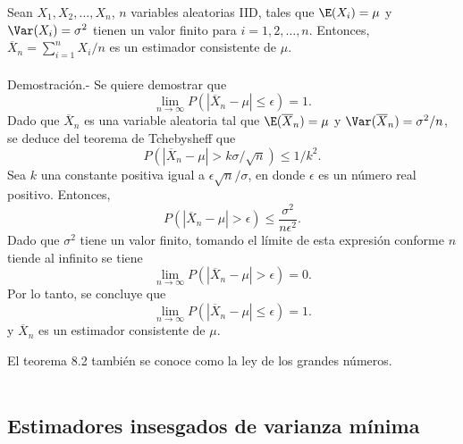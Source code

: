 \begin{teo}
    Sean $X_1,X_2,\ldots,X_n$, $n$ variables aleatorias IID, tales que $\E(X_i)=\mu$ y $\Var(X_i)=\sigma^2$ tienen un valor finito para $i=1,2,\ldots,n.$ Entonces, $\overline{X}_n=\sum_{i=1}^n X_i/n$ es un estimador consistente de $\mu$.\\\\
	Demostración.-\; Se quiere demostrar que
	$$\lim_{n\to \infty}P(|\overline{X}_n-\mu|\leq \epsilon)=1.$$
	Dado que $\overline{X}_n$ es una variable aleatoria tal que $\E(\overline{X}_n)=\mu$ y $\Var(\overline{X}_n)=\sigma^2/n$, se deduce del teorema de Tchebysheff que
	$$P(|\overline{X}_n-\mu|>k\sigma/\sqrt{n})\leq 1/k^2.$$
    Sea $k$ una constante positiva igual a $\epsilon\sqrt{n}/\sigma$, en donde $\epsilon$ es un número real positivo. Entonces,
	$$P(|\overline{X}_n-\mu|>\epsilon)\leq \dfrac{\sigma^2}{n\epsilon^2}.$$
	Dado que $\sigma^2$ tiene un valor finito, tomando el límite de esta expresión conforme $n$ tiende al infinito se tiene
	$$\lim_{n\to \infty}P(|\overline{X}_n-\mu|> \epsilon)=0.$$
	Por lo tanto, se concluye que
	$$\lim_{n\to \infty}P(|\overline{X}_n-\mu|\leq \epsilon)=1.$$
	y $\overline{X}_n$ es un estimador consistente de $\mu$.
\end{teo}

El teorema 8.2 también se conoce como la ley de los grandes números.\\\\


\subsection{Estimadores insesgados de varianza mínima}
